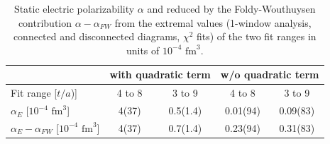 \begin{table}[H]
\begin{center}
    \begin{tabular}{|l||c|c||c|c||}
    \hline	& \multicolumn{2}{c}{with quadratic term} & \multicolumn{2}{c}{w/o quadratic term} \\ \hline
     Fit range [$t/a$)]						& 4 to 8 	& 3 to 9 	& 4 to 8 	& 3 to 9 \\ \hline 
     $\alpha_E$ [$10^{-4}$ $\text{fm}^3$]    		& 4(37)	& 0.5(1.4) 	& 0.01(94)	& 0.09(83) \\ \hline     
     $\alpha_E-\alpha_{FW}$ [$10^{-4}$ $\text{fm}^3$]& 4(37)	&  0.7(1.4)	& 0.23(94)	& 0.31(83) \\ \hline
    \end{tabular}
\end{center}
\caption{Static electric polarizability  $\alpha$ and reduced by the Foldy-Wouthuysen contribution $\alpha-\alpha_{FW}$ from the extremal values (1-window analysis, connected and disconnected diagrams, $\chi^2$ fits) of the two fit ranges in units of $10^{-4}$ $\text{fm}^3$. }
\label{tab:1wElectricPolarizabilityAllMultiPoint}
\end{table}
